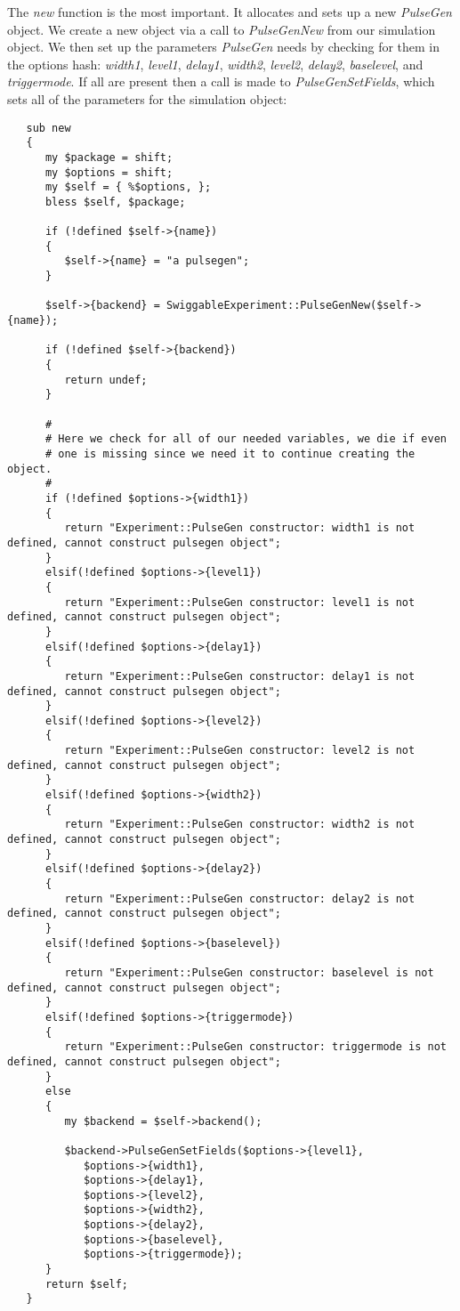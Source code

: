 \documentclass[12pt]{article}
\begin{document}
The {\it new} function is the most important. It allocates and sets up a new {\it PulseGen} object. We create a new object via a call to {\it PulseGenNew} from our simulation object. We then set up the parameters {\it PulseGen} needs by checking for them in the options hash: {\it width1}, {\it level1}, {\it delay1}, {\it width2}, {\it level2}, {\it delay2}, {\it baselevel}, and {\it triggermode}. If all are present then a call is made to {\it PulseGenSetFields}, which sets all of the parameters for the simulation object:
\begin{verbatim}
   sub new
   {
      my $package = shift;
      my $options = shift;
      my $self = { %$options, };
      bless $self, $package;

      if (!defined $self->{name})
      {
         $self->{name} = "a pulsegen";
      }

      $self->{backend} = SwiggableExperiment::PulseGenNew($self->{name});

      if (!defined $self->{backend})
      {
         return undef;
      }

      #
      # Here we check for all of our needed variables, we die if even 
      # one is missing since we need it to continue creating the object.
      #
      if (!defined $options->{width1})
      {   
         return "Experiment::PulseGen constructor: width1 is not defined, cannot construct pulsegen object";
      }
      elsif(!defined $options->{level1})
      {
         return "Experiment::PulseGen constructor: level1 is not defined, cannot construct pulsegen object";
      }
      elsif(!defined $options->{delay1})
      {
         return "Experiment::PulseGen constructor: delay1 is not defined, cannot construct pulsegen object";
      }
      elsif(!defined $options->{level2})
      {
         return "Experiment::PulseGen constructor: level2 is not defined, cannot construct pulsegen object";
      }
      elsif(!defined $options->{width2})
      {
         return "Experiment::PulseGen constructor: width2 is not defined, cannot construct pulsegen object";
      }
      elsif(!defined $options->{delay2})
      {
         return "Experiment::PulseGen constructor: delay2 is not defined, cannot construct pulsegen object";
      }
      elsif(!defined $options->{baselevel})
      {
         return "Experiment::PulseGen constructor: baselevel is not defined, cannot construct pulsegen object";
      }
      elsif(!defined $options->{triggermode})
      {
         return "Experiment::PulseGen constructor: triggermode is not defined, cannot construct pulsegen object";
      }
      else
      {
         my $backend = $self->backend();

         $backend->PulseGenSetFields($options->{level1},
            $options->{width1},
            $options->{delay1},
            $options->{level2},
            $options->{width2},
            $options->{delay2},
            $options->{baselevel},
            $options->{triggermode});
      }
      return $self;
   }
\end{verbatim}
\end{document}
